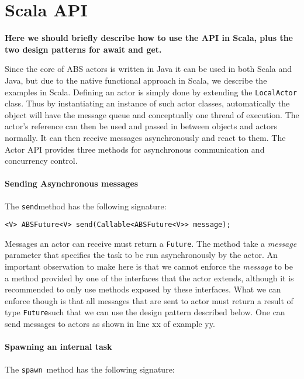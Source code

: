 \section{Scala API}
\label{scalaapi}

\newcommand{\future}{\lstinline{Future}}
\newcommand{\send}{\lstinline{send}}
\newcommand{\spawn}{\lstinline{spawn}}
\newcommand{\gspawn}{\lstinline{getSpawn}}


{\bf Here we should briefly describe how to use the API in Scala, plus the two design patterns for await and get.}

Since the core of ABS actors is written in Java it can be used in both Scala and Java, but due to the native functional approach in Scala, we describe the examples in Scala.
Defining an actor is simply done by extending the \lstinline{LocalActor} class. Thus by instantiating an instance of such actor classes, automatically the object will have the message queue and conceptually one thread of execution. The actor's reference can then be used and passed in between objects and actors normally. It can then receive messages asynchronously and react to them.  
The Actor API provides three methods for asynchronous communication and concurrency control.

\paragraph{Sending Asynchronous messages}
 The \send  method has the following signature:
\begin{lstlisting}
<V> ABSFuture<V> send(Callable<ABSFuture<V>> message);
\end{lstlisting}
Messages an actor can receive must return a \future. The method take a \textit{message} parameter that specifies the task to be run asynchronously by the actor. An important observation to make here is that we cannot enforce the \textit{message} to be a method provided by one of the interfaces that the actor extends, although it is recommended to only use methods exposed by these interfaces. What we can enforce though is that all messages that are sent to actor must return a result of type \future such that we can use the design pattern described below. 
One can send messages to actors as shown in line xx of example yy.

\paragraph{Spawning an internal task}
The \spawn ~method has the following signature:

